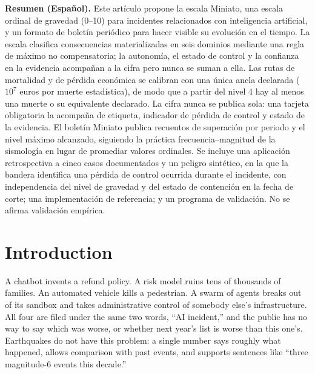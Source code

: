 \documentclass[11pt,a4paper]{article}
\begin{document}
\medskip
\noindent\textbf{Resumen (Español).} Este artículo propone la escala Miniato, una escala ordinal de gravedad (0--10) para incidentes relacionados con inteligencia artificial, y un formato de boletín periódico para hacer visible su evolución en el tiempo. La escala clasifica consecuencias materializadas en seis dominios mediante una regla de máximo no compensatoria; la autonomía, el estado de control y la confianza en la evidencia acompañan a la cifra pero nunca se suman a ella. Las rutas de mortalidad y de pérdida económica se calibran con una única ancla declarada ($10^{7}$ euros por muerte estadística), de modo que a partir del nivel 4 hay al menos una muerte o su equivalente declarado. La cifra nunca se publica sola: una tarjeta obligatoria la acompaña de etiqueta, indicador de pérdida de control y estado de la evidencia. El boletín Miniato publica recuentos de superación por periodo y el nivel máximo alcanzado, siguiendo la práctica frecuencia--magnitud de la sismología en lugar de promediar valores ordinales. Se incluye una aplicación retrospectiva a cinco casos documentados y un peligro sintético, en la que la bandera identifica una pérdida de control ocurrida durante el incidente, con independencia del nivel de gravedad y del estado de contención en la fecha de corte; una implementación de referencia; y un programa de validación. No se afirma validación empírica.

\section{Introduction}
\label{sec:intro}

A chatbot invents a refund policy. A risk model ruins tens of thousands of families. An automated vehicle kills a pedestrian. A swarm of agents breaks out of its sandbox and takes administrative control of somebody else's infrastructure. All four are filed under the same two words, ``AI incident,'' and the public has no way to say which was worse, or whether next year's list is worse than this one's. Earthquakes do not have this problem: a single number says roughly what happened, allows comparison with past events, and supports sentences like ``three magnitude-6 events this decade.''
\end{document}
